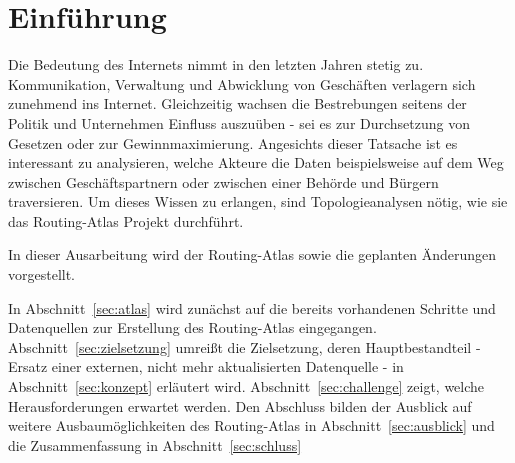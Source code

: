 \newpage

\section{Einführung}

Die Bedeutung des Internets nimmt in den letzten Jahren stetig zu.
Kommunikation, Verwaltung und Abwicklung von Geschäften verlagern sich zunehmend ins Internet.
Gleichzeitig wachsen die Bestrebungen seitens der Politik und Unternehmen Einfluss auszuüben - sei es zur Durchsetzung von Gesetzen oder zur Gewinnmaximierung.
Angesichts dieser Tatsache ist es interessant zu analysieren, welche Akteure die Daten beispielsweise auf dem Weg zwischen Geschäftspartnern oder zwischen einer Behörde und Bürgern traversieren. %
Um dieses Wissen zu erlangen, sind Topologieanalysen nötig, wie sie das Routing-Atlas Projekt durchführt.

In dieser Ausarbeitung wird der Routing-Atlas sowie die geplanten Änderungen vorgestellt.

In Abschnitt~\ref{sec:atlas} wird zunächst auf die bereits vorhandenen Schritte und Datenquellen zur Erstellung des Routing-Atlas eingegangen.
Abschnitt~\ref{sec:zielsetzung} umreißt die Zielsetzung, deren Hauptbestandteil - Ersatz einer externen, nicht mehr aktualisierten Datenquelle - in Abschnitt~\ref{sec:konzept} erläutert wird.
Abschnitt~\ref{sec:challenge} zeigt, welche Herausforderungen erwartet werden.
Den Abschluss bilden der Ausblick auf weitere Ausbaumöglichkeiten des Routing-Atlas in Abschnitt~\ref{sec:ausblick} und die Zusammenfassung in Abschnitt~\ref{sec:schluss}




